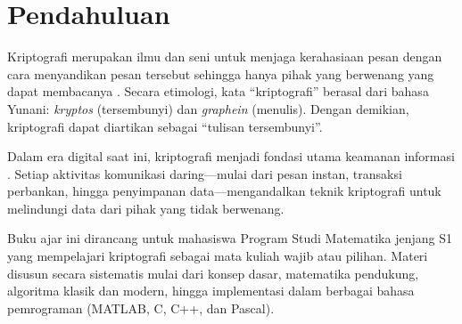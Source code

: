 \section{Pendahuluan}

Kriptografi merupakan ilmu dan seni untuk menjaga kerahasiaan pesan dengan cara menyandikan pesan tersebut sehingga hanya pihak yang berwenang yang dapat membacanya \cite{katz2020}. Secara etimologi, kata ``kriptografi'' berasal dari bahasa Yunani: \textit{kryptos} (tersembunyi) dan \textit{graphein} (menulis). Dengan demikian, kriptografi dapat diartikan sebagai ``tulisan tersembunyi''.

Dalam era digital saat ini, kriptografi menjadi fondasi utama keamanan informasi \cite{stallings2017}. Setiap aktivitas komunikasi daring---mulai dari pesan instan, transaksi perbankan, hingga penyimpanan data---mengandalkan teknik kriptografi untuk melindungi data dari pihak yang tidak berwenang.

Buku ajar ini dirancang untuk mahasiswa Program Studi Matematika jenjang S1 yang mempelajari kriptografi sebagai mata kuliah wajib atau pilihan. Materi disusun secara sistematis mulai dari konsep dasar, matematika pendukung, algoritma klasik dan modern, hingga implementasi dalam berbagai bahasa pemrograman (MATLAB, C, C++, dan Pascal).
